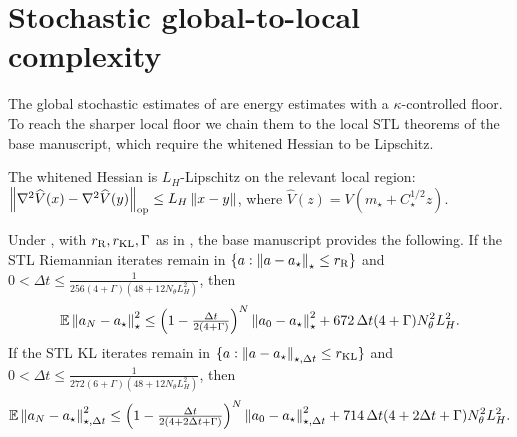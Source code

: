 \section{Stochastic global-to-local complexity}

The global stochastic estimates of  are energy
estimates with a $\kappa$-controlled floor. To reach the sharper local floor we chain them
to the local STL theorems of the base manuscript, which require the whitened Hessian to be
Lipschitz.

\begin{assumption}
\label{assump:Hess-smooth}
The whitened Hessian is $L_H$-Lipschitz on the relevant local region:
$\left\lVert \nabla^2\widehat V(x)-\nabla^2\widehat V(y)\right\rVert_{\mathrm{op}}\leq L_H\left\lVert x-y\right\rVert$, where
$\widehat V(z)=V(m_\star+C_\star^{1/2}z)$.
\end{assumption}

\begin{assumption}
\label{assump:local-STL}
Under , with $r_{\mathrm{R}},r_{\mathrm{KL}},\Gamma$ as
in , the base manuscript provides the following. If the STL
Riemannian iterates remain in $\{a:\left\lVert a-a_\star\right\rVert_\star\leq r_{\mathrm{R}}\}$ and
$0<\Delta t\leq\tfrac1{256(4+\Gamma)(48+12N_\theta L_H^2)}$, then
\[
    \mathbb{E}\left\lVert a_N-a_\star\right\rVert_\star^2
    \leq
    \Bigl(1-\tfrac{\Delta t}{2(4+\Gamma)}\Bigr)^N\left\lVert a_0-a_\star\right\rVert_\star^2
    +
    672\,\Delta t(4+\Gamma)N_\theta^2L_H^2 .
\]
If the STL KL iterates remain in $\{a:\left\lVert a-a_\star\right\rVert_{\star,\Delta t}\leq r_{\mathrm{KL}}\}$ and
$0<\Delta t\leq\tfrac1{272(6+\Gamma)(48+12N_\theta L_H^2)}$, then
\[
    \mathbb{E}\left\lVert a_N-a_\star\right\rVert_{\star,\Delta t}^2
    \leq
    \Bigl(1-\tfrac{\Delta t}{2(4+2\Delta t+\Gamma)}\Bigr)^N\left\lVert a_0-a_\star\right\rVert_{\star,\Delta t}^2
    +
    714\,\Delta t(4+2\Delta t+\Gamma)N_\theta^2L_H^2 .
\]
\end{assumption}

